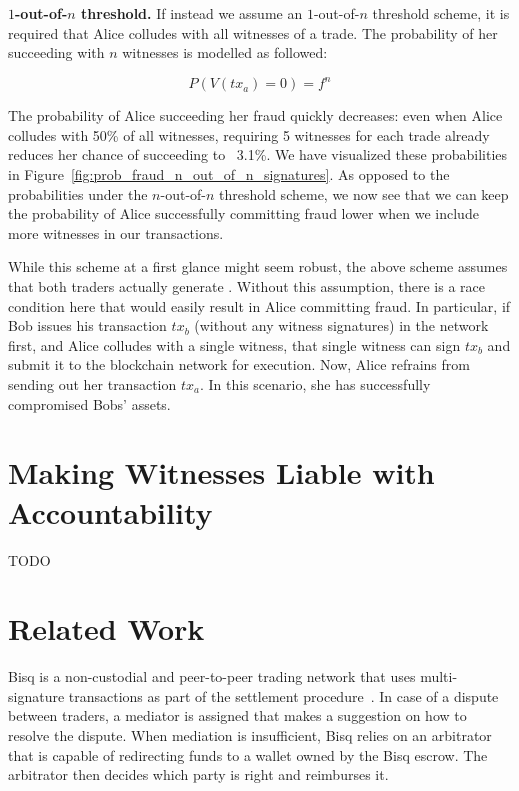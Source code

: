 \documentclass{article}
\begin{document}
\textbf{$1$-out-of-$n$ threshold.}
If instead we assume an $1$-out-of-$n$ threshold scheme, it is required that Alice colludes with all witnesses of a trade.
The probability of her succeeding with $ n $ witnesses is modelled as followed:

\begin{equation}
	P(V(tx_a) = 0) = f^n
\end{equation}

The probability of Alice succeeding her fraud quickly decreases: even when Alice colludes with 50\% of all witnesses, requiring 5 witnesses for each trade already reduces her chance of succeeding to ~3.1\%.
We have visualized these probabilities in Figure~\ref{fig:prob_fraud_n_out_of_n_signatures}.
As opposed to the probabilities under the $n$-out-of-$n$ threshold scheme, we now see that we can keep the probability of Alice successfully committing fraud lower when we include more witnesses in our transactions.

While this scheme at a first glance might seem robust, the above scheme assumes that both traders actually generate .
Without this assumption, there is a race condition here that would easily result in Alice committing fraud.
In particular, if Bob issues his transaction $tx_b$ (without any witness signatures) in the network first, and Alice colludes with a single witness, that single witness can sign $ tx_b $ and submit it to the blockchain network for execution.
Now, Alice refrains from sending out her transaction $tx_a$.
In this scenario, she has successfully compromised Bobs' assets.


\section{Making Witnesses Liable with Accountability}
TODO

\section{Related Work}
Bisq is a non-custodial and peer-to-peer trading network that uses multi-signature transactions as part of the settlement procedure~\cite{bisq}.
In case of a dispute between traders, a mediator is assigned that makes a suggestion on how to resolve the dispute.
When mediation is insufficient, Bisq relies on an arbitrator that is capable of redirecting funds to a wallet owned by the Bisq escrow.
The arbitrator then decides which party is right and reimburses it.



\end{document}
